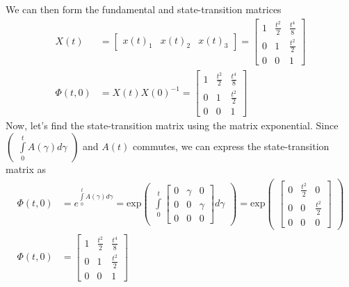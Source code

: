 \documentclass[twoside]{article}
\begin{document}
%
We can then form the fundamental and state-transition matrices 
%
\begin{align*}
	X(t) &= \begin{bmatrix} x(t)_1 & x(t)_2 & x(t)_3 \end{bmatrix}  = \begin{bmatrix} 1 & \frac{t^2}{2} & \frac{t^4}{8} \\ 0 & 1 & \frac{t^2}{2} \\ 0 & 0 & 1 \end{bmatrix} 
	\\
	\Phi(t,0) &= X(t)X(0)^{-1} = \begin{bmatrix} 1 & \frac{t^2}{2} & \frac{t^4}{8} \\ 0 & 1 & \frac{t^2}{2} \\ 0 & 0 & 1 \end{bmatrix} 
\end{align*}
% 
Now, let's find the state-transition matrix using the matrix exponential. Since $\begin{pmatrix} \int\limits_{0}^{t} A(\gamma) d\gamma \end{pmatrix}$ and $A(t)$ commutes, we can express the state-transition matrix as
%
\begin{align*}
	\Phi(t,0) &= e^{ \int\limits_{0}^{t} A(\gamma) d\gamma } 
	= \mathrm{exp} \begin{pmatrix} \int\limits_{0}^{t} \begin{bmatrix} 0 & \gamma & 0 \\ 0 & 0 & \gamma \\ 0 & 0 & 0 \end{bmatrix} d\gamma \end{pmatrix}	
	= \mathrm{exp} \begin{pmatrix} \begin{bmatrix} 0 & \frac{t^2}{2} & 0 \\ 0 & 0 & \frac{t^2}{2} \\ 0 & 0 & 0 \end{bmatrix} \end{pmatrix}	
	\\
	\Phi(t,0) &= \begin{bmatrix} 1 & \frac{t^2}{2} & \frac{t^4}{8} \\ 0 & 1 & \frac{t^2}{2} \\ 0 & 0 & 1 \end{bmatrix} 
\end{align*}
\end{document}
